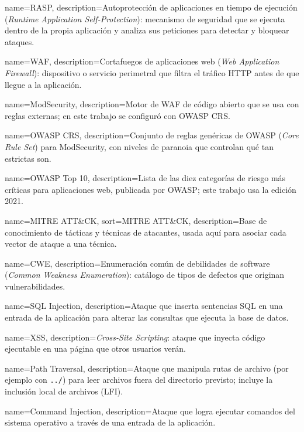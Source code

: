 {
    name={RASP},
    description={Autoprotección de aplicaciones en tiempo de ejecución (\textit{Runtime Application Self-Protection}): mecanismo de seguridad que se ejecuta dentro de la propia aplicación y analiza sus peticiones para detectar y bloquear ataques.}
}

{
    name={WAF},
    description={Cortafuegos de aplicaciones web (\textit{Web Application Firewall}): dispositivo o servicio perimetral que filtra el tráfico HTTP antes de que llegue a la aplicación.}
}

{
    name={ModSecurity},
    description={Motor de WAF de código abierto que se usa con reglas externas; en este trabajo se configuró con OWASP CRS.}
}

{
    name={OWASP CRS},
    description={Conjunto de reglas genéricas de OWASP (\textit{Core Rule Set}) para ModSecurity, con niveles de paranoia que controlan qué tan estrictas son.}
}

{
    name={OWASP Top 10},
    description={Lista de las diez categorías de riesgo más críticas para aplicaciones web, publicada por OWASP; este trabajo usa la edición 2021.}
}

{
    name={MITRE ATT\&CK},
    sort={MITRE ATT&CK},
    description={Base de conocimiento de tácticas y técnicas de atacantes, usada aquí para asociar cada vector de ataque a una técnica.}
}

{
    name={CWE},
    description={Enumeración común de debilidades de software (\textit{Common Weakness Enumeration}): catálogo de tipos de defectos que originan vulnerabilidades.}
}

{
    name={SQL Injection},
    description={Ataque que inserta sentencias SQL en una entrada de la aplicación para alterar las consultas que ejecuta la base de datos.}
}

{
    name={XSS},
    description={\textit{Cross-Site Scripting}: ataque que inyecta código ejecutable en una página que otros usuarios verán.}
}

{
    name={Path Traversal},
    description={Ataque que manipula rutas de archivo (por ejemplo con \texttt{../}) para leer archivos fuera del directorio previsto; incluye la inclusión local de archivos (LFI).}
}

{
    name={Command Injection},
    description={Ataque que logra ejecutar comandos del sistema operativo a través de una entrada de la aplicación.}
}

